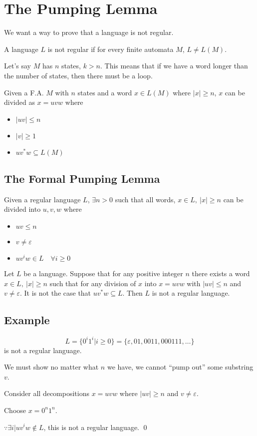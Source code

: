 \documentclass[12pt]{article}
\begin{document}
\section{The Pumping Lemma}

We want a way to prove that a language is not regular.

A language $L$ is not regular if for every finite automata $M$, $L \neq L(M)$.

Let's say $M$ has $n$ states, $k>n$. This means that if we have a word longer
than the number of states, then there must be a loop.

Given a F.A. $M$ with $n$ states and a word $x \in L(M)$ where $|x| \geq n$, $x$
can be divided as $x = uvw$ where
\begin{itemize}
    \item $|uv| \leq n$
    \item $|v| \geq 1$
    \item $uv^*w \subseteq L(M)$
\end{itemize}

\subsection{The Formal Pumping Lemma}

Given a regular language $L$, $\exists n>0$ such that all words, $x\in L,\
|x|\geq n$ can be divided into $u,v,w$ where
\begin{itemize}
    \item $uv\leq n$
    \item $v \neq \varepsilon$
    \item $uv^iw \in L\quad \forall i\geq 0$
\end{itemize}

Let $L$ be a language. Suppose that for any positive integer $n$ there exists a
word $x\in L,\ |x|\geq n$ such that for any division of $x$ into $x=uvw$ with
$|uv|\leq n$ and $v \neq \varepsilon$. It is not the case that $uv^*w \subseteq
L$. Then $L$ is not a regular language.

\subsection{Example}

\[
L = \{0^i1^i|i\geq0\} = \{\varepsilon,01,0011,000111,\dots\}
\]
is not a regular language.

We must show no matter what $n$ we have, we cannot ``pump out'' some substring
$v$.

Consider all decompositions $x = uvw$ where $|uv|\geq n$ and $v \neq
\varepsilon$.

Choose $x = 0^n1^n$.

$\because \exists i | uv^iw \not \in L$, this is not a regular language.
\qed
\end{document}
